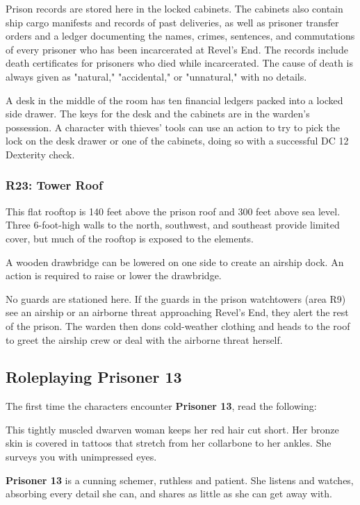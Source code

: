 \documentclass[10pt,a4paper,twoside,bg=print,twocolumn,openany,nodeprecatedcode]{dndbook}
\begin{document}
Prison records are stored here in the locked cabinets. The cabinets also contain ship cargo manifests and records of past deliveries, as well as prisoner transfer orders and a ledger documenting the names, crimes, sentences, and commutations of every prisoner who has been incarcerated at Revel's End. The records include death certificates for prisoners who died while incarcerated. The cause of death is always given as "natural," "accidental," or "unnatural," with no details.

A desk in the middle of the room has ten financial ledgers packed into a locked side drawer. The keys for the desk and the cabinets are in the warden's possession. A character with thieves' tools can use an action to try to pick the lock on the desk drawer or one of the cabinets, doing so with a successful DC 12 Dexterity check.

\subsubsection{R23: Tower Roof}
This flat rooftop is 140 feet above the prison roof and 300 feet above sea level. Three 6-foot-high walls to the north, southwest, and southeast provide limited cover, but much of the rooftop is exposed to the elements.

A wooden drawbridge can be lowered on one side to create an airship dock. An action is required to raise or lower the drawbridge.

No guards are stationed here. If the guards in the prison watchtowers (area R9) see an airship or an airborne threat approaching Revel's End, they alert the rest of the prison. The warden then dons cold-weather clothing and heads to the roof to greet the airship crew or deal with the airborne threat herself.

\subsection{Roleplaying Prisoner 13}
The first time the characters encounter \textbf{Prisoner 13}, read the following:

\begin{DndReadAloud}{}
This tightly muscled dwarven woman keeps her red hair cut short. Her bronze skin is covered in tattoos that stretch from her collarbone to her ankles. She surveys you with unimpressed eyes.

\end{DndReadAloud}

\textbf{Prisoner 13} is a cunning schemer, ruthless and patient. She listens and watches, absorbing every detail she can, and shares as little as she can get away with.
\end{document}
